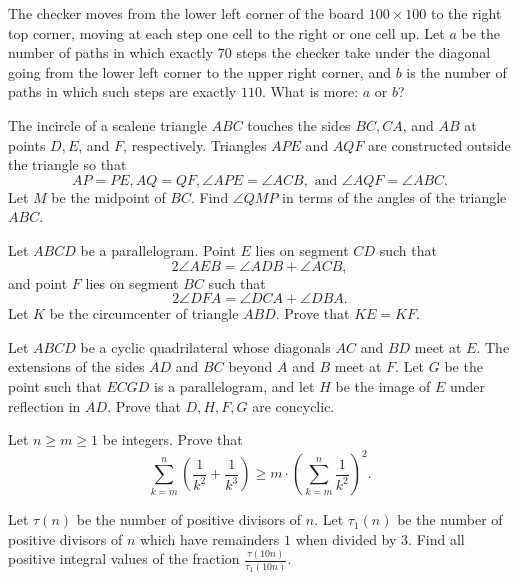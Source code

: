 \documentclass[11pt]{scrartcl}
\begin{document}
\begin{problem}[677860185151955]
	The checker moves from the lower left corner of the board $100 \times 100$ to the right top corner, moving at each step one cell to the right or one cell up. Let $a$ be the number of paths in which exactly $70$ steps the checker take under the diagonal going from the lower left corner to the upper right corner, and $b$ is the number of paths in which such steps are exactly $110$. What is more: $a$ or $b$?
\end{problem}
\begin{problem}[221552874820768]
The incircle of a scalene triangle $ABC$ touches the sides $BC, CA$, and $AB$ at points $D, E$, and $F$, respectively. Triangles $APE$ and $AQF$ are constructed outside the triangle so that\[AP =PE, AQ=QF, \angle APE=\angle ACB,\text{ and }\angle AQF =\angle ABC.\]Let $M$ be the midpoint of $BC$. Find $\angle QMP$ in terms of the angles of the triangle $ABC$.
\end{problem}
\begin{problem}[6190379360381554657]
	Let $ABCD$ be a parallelogram. Point $E$ lies on segment $CD$ such that\[2\angle AEB=\angle ADB+\angle ACB,\]and point $F$ lies on segment $BC$ such that\[2\angle DFA=\angle DCA+\angle DBA.\]Let $K$ be the circumcenter of triangle $ABD$. Prove that $KE=KF$.
\end{problem}
\begin{problem}[674938537981329]
Let $ABCD$ be a cyclic quadrilateral whose diagonals $AC$ and $BD$ meet at $E$. The extensions of the sides $AD$ and $BC$ beyond $A$ and $B$ meet at $F$. Let $G$ be the point such that $ECGD$ is a parallelogram, and let $H$ be the image of $E$ under reflection in $AD$. Prove that $D,H,F,G$ are concyclic.
\end{problem}
\begin{problem}[5968448186928885521]
Let $n\ge m\ge 1$ be integers. Prove that
\[\sum_{k=m}^n \left (\frac 1{k^2}+\frac 1{k^3}\right) \ge m\cdot \left(\sum_{k=m}^n \frac 1{k^2}\right)^2.\]
\end{problem}
\begin{problem}[712950951787328]
	Let $\tau(n)$ be the number of positive divisors of $n$. Let $\tau_1(n)$ be the number of positive divisors of $n$ which have remainders $1$ when divided by $3$. Find all positive integral values of the fraction $\frac{\tau(10n)}{\tau_1(10n)}$.
\end{problem}
\end{document}
